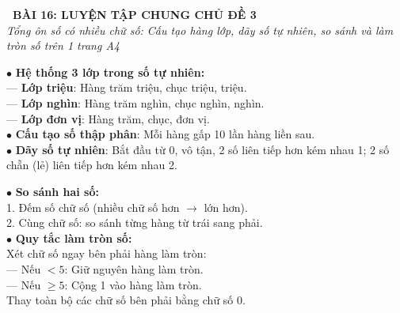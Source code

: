 \documentclass[14pt,a4paper,oneside]{extbook}
\begin{document}
\noindent
\begin{tcolorbox}[
  enhanced,
  colback=teal!8!white,
  colframe=teal!80!black,
  arc=3mm, boxrule=1pt,
  left=3mm, right=3mm, top=2mm, bottom=2mm,
  halign=center
]
  {\Large\bfseries\color{teal!90!black}\faBookmark\ BÀI 16: LUYỆN TẬP CHUNG CHỦ ĐỀ 3}\\[1.5pt]
  {\footnotesize\itshape\color{black!75} Tổng ôn số có nhiều chữ số: Cấu tạo hàng lớp, dãy số tự nhiên, so sánh và làm tròn số trên 1 trang A4}
\end{tcolorbox}

\vspace{2mm}

\noindent
\begin{minipage}[t]{0.49\textwidth}
  \begin{tcolorbox}[
    enhanced,
    title={\footnotesize\bfseries\color{white}\faThList\ 1. Cấu tạo lớp \& Dãy số tự nhiên},
    colback=blue!2!white,
    colframe=blue!75!black,
    arc=2.5mm, boxrule=0.8pt, top=1.8mm, bottom=1.8mm, left=2mm, right=2mm
  ]
    \footnotesize
    $\bullet$ \textbf{Hệ thống 3 lớp trong số tự nhiên:}\\
    --- \textbf{Lớp triệu}: Hàng trăm triệu, chục triệu, triệu.\\
    --- \textbf{Lớp nghìn}: Hàng trăm nghìn, chục nghìn, nghìn.\\
    --- \textbf{Lớp đơn vị}: Hàng trăm, chục, đơn vị.\\
    $\bullet$ \textbf{Cấu tạo số thập phân}: Mỗi hàng gấp 10 lần hàng liền sau.\\
    $\bullet$ \textbf{Dãy số tự nhiên}: Bắt đầu từ 0, vô tận, 2 số liên tiếp hơn kém nhau 1; 2 số chẵn (lẻ) liên tiếp hơn kém nhau 2.
  \end{tcolorbox}
\end{minipage}%
\hfill
\begin{minipage}[t]{0.49\textwidth}
  \begin{tcolorbox}[
    enhanced,
    title={\footnotesize\bfseries\color{white}\faBalanceScale\ 2. So sánh \& Làm tròn số},
    colback=teal!2!white,
    colframe=teal!75!black,
    arc=2.5mm, boxrule=0.8pt, top=1.8mm, bottom=1.8mm, left=2mm, right=2mm
  ]
    \footnotesize
    $\bullet$ \textbf{So sánh hai số:}\\
    1. Đếm số chữ số (nhiều chữ số hơn $\rightarrow$ lớn hơn).\\
    2. Cùng chữ số: so sánh từng hàng từ trái sang phải.\\
    $\bullet$ \textbf{Quy tắc làm tròn số:}\\
    Xét chữ số ngay bên phải hàng làm tròn:\\
    --- Nếu $< 5$: Giữ nguyên hàng làm tròn.\\
    --- Nếu $\ge 5$: Cộng 1 vào hàng làm tròn.\\
    Thay toàn bộ các chữ số bên phải bằng chữ số 0.
  \end{tcolorbox}
\end{minipage}
\end{document}
